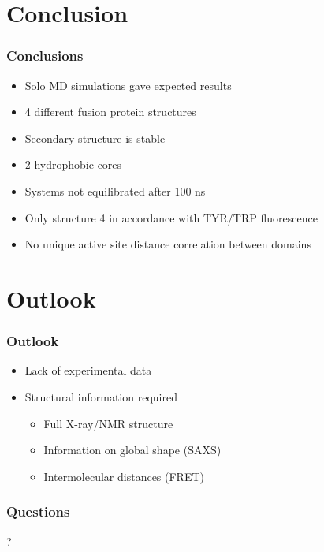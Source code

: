 \documentclass[english]{beamer}
\begin{document}
 

\section{Conclusion}

\begin{frame}
    \frametitle{Conclusions}

    \begin{itemize}
        \item<1-> Solo MD simulations gave expected results
        \item<2-> 4 different fusion protein structures
        \item<3-> Secondary structure is stable
        \item<4-> 2 hydrophobic cores
        \item<5-> Systems not equilibrated after 100 ns
        \item<6-> Only structure 4 in accordance with TYR/TRP fluorescence
        \item<7-> No unique active site distance correlation between domains
    \end{itemize}

\end{frame}        


\section{Outlook}

\begin{frame}
    \frametitle{Outlook}


    \begin{itemize}
        \item<1-> Lack of experimental data
        \item<2-> Structural information required
            \begin{itemize}
                \item<2-> Full X-ray/NMR structure
                \item<2-> Information on global shape (SAXS)
                \item<2-> Intermolecular distances (FRET)
            \end{itemize}
    \end{itemize}


\end{frame}   


\begin{frame}
    \frametitle{Questions}

    \vfill
    \centering
    \Huge ?
    \vfill


\end{frame}   
 
\end{document}
